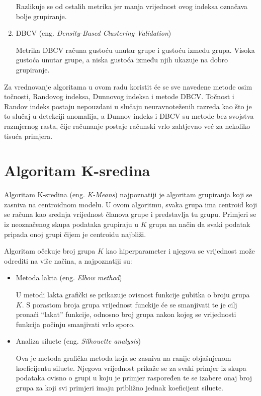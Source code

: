 \documentclass[utf8, diplomski, numeric]{fer}
\begin{document}
\begin{enumerate}
Razlikuje se od ostalih metrika jer manja vrijednost ovog indeksa označava bolje grupiranje.

\item DBCV (eng. \textit{Density-Based Clustering Validation})

Metrika DBCV računa gustoću unutar grupe i gustoću između grupa. Visoka gustoća unutar grupe, a niska gustoća između njih ukazuje na dobro grupiranje.

\end{enumerate}

Za vrednovanje algoritama u ovom radu koristit će se sve navedene metode osim točnosti, Randovog indeksa, Dunnovog indeksa i metode DBCV. Točnost i Randov indeks postaju nepouzdani u slučaju neuravnoteženih razreda kao što je to slučaj u detekciji anomalija, a Dunnov indeks i DBCV su metode bez svojstva razmjernog rasta, čije računanje postaje računski vrlo zahtjevno već za nekoliko tisuća primjera.

\section{Algoritam K-sredina}
Algoritam K-sredina (eng. \textit{K-Means}) najpoznatiji je algoritam grupiranja koji se zasniva na centroidnom modelu. U ovom algoritmu, svaka grupa ima centroid koji se računa kao srednja vrijednost članova grupe i predstavlja tu grupu. Primjeri se iz neoznačenog skupa podataka grupiraju u $K$ grupa na način da svaki podatak pripada onoj grupi čijem je centroidu najbliži. 

Algoritam očekuje broj grupa $K$ kao hiperparameter i njegova se vrijednost može odrediti na više načina, a najpoznatiji su:
\begin{itemize}
\item Metoda lakta (eng. \textit{Elbow method})

U metodi lakta grafički se prikazuje ovisnost funkcije gubitka o broju grupa $K$. S porastom broja grupa vrijednost funckije će se smanjivati te je cilj pronaći ``lakat'' funkcije, odnosno broj grupa nakon kojeg se vrijednosti funkcija počinju smanjivati vrlo sporo.

\item Analiza siluete (eng. \textit{Silhouette analysis})

Ova je metoda grafička metoda koja se zasniva na ranije objašnjenom koeficijentu siluete. Njegova vrijednost prikaže se za svaki primjer iz skupa podataka ovisno o grupi u koju je primjer raspoređen te se izabere onaj broj grupa za koji svi primjeri imaju približno jednak koeficijent siluete.
\end{itemize}
\end{document}
